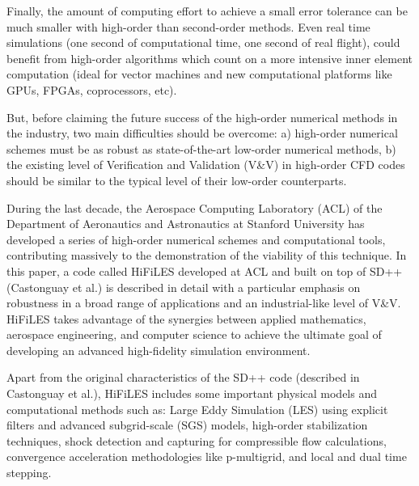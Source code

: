 Finally, the amount of computing effort to achieve a small error tolerance can be much smaller with high-order than second-order methods. Even real time simulations (one second of computational time, one second of real flight), could benefit from high-order algorithms which count on a more intensive inner element computation (ideal for vector machines and new computational platforms like GPUs, FPGAs, coprocessors, etc).

But, before claiming the future success of the high-order numerical methods in the industry, two main difficulties should be overcome: a) high-order numerical schemes must be as robust as state-of-the-art low-order numerical methods, b) the existing level of Verification and Validation (V\&V) in high-order CFD codes should be similar to the typical level of their low-order counterparts.

During the last decade, the Aerospace Computing Laboratory (ACL) of the Department of Aeronautics and Astronautics at Stanford University has developed a series of high-order numerical schemes and computational tools, contributing massively to the demonstration of the viability of this technique. In this paper, a code called HiFiLES developed at ACL and built on top of SD++ (Castonguay et al.\cite{castonguay2011}) is described in detail with a particular emphasis on robustness in a broad range of applications and an industrial-like level of V\&V. HiFiLES takes advantage of the synergies between applied mathematics, aerospace engineering, and computer science to achieve the ultimate goal of developing an advanced high-fidelity simulation environment.

Apart from the original characteristics of the SD++ code (described in Castonguay et al.\cite{castonguay2011}), HiFiLES includes some important physical models and computational methods such as: Large Eddy Simulation (LES) using explicit filters and advanced subgrid-scale (SGS) models, high-order stabilization techniques, shock detection and capturing for compressible flow calculations, convergence acceleration methodologies like p-multigrid, and local and dual time stepping.


